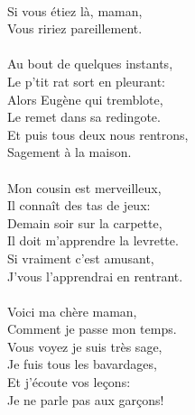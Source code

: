 {\\Si vous étiez là, maman,
\\Vous ririez pareillement.
\\\\Au bout de quelques instants,
\\Le p'tit rat sort en pleurant:
\\Alors Eugène qui tremblote,
\\Le remet dans sa redingote.
\\Et puis tous deux nous rentrons,
\\Sagement à la maison.
\\\\Mon cousin est merveilleux,
\\Il connaît des tas de jeux:
\\Demain soir sur la carpette,
\\Il doit m'apprendre la levrette.
\\Si vraiment c'est amusant,
\\J'vous l'apprendrai en rentrant.
\\\\Voici ma chère maman,
\\Comment je passe mon temps.
\\Vous voyez je suis très sage,
\\Je fuis tous les bavardages,
\\Et j'écoute vos leçons:
\\Je ne parle pas aux garçons!
}

\breakpage